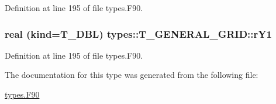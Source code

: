 Definition at line 195 of file types.F90.

\hypertarget{typetypes_1_1_t___g_e_n_e_r_a_l___g_r_i_d_a8f03f64e3989eb22d90f200d787fc440}{
\subsubsection[{rY1}]{\setlength{\rightskip}{0pt plus 5cm}real (kind={\bf T\_\-DBL}) {\bf types::T\_\-GENERAL\_\-GRID::rY1}}}
\label{typetypes_1_1_t___g_e_n_e_r_a_l___g_r_i_d_a8f03f64e3989eb22d90f200d787fc440}


Definition at line 195 of file types.F90.



The documentation for this type was generated from the following file:\begin{DoxyCompactItemize}
\item 
\hyperlink{types_8_f90}{types.F90}\end{DoxyCompactItemize}
